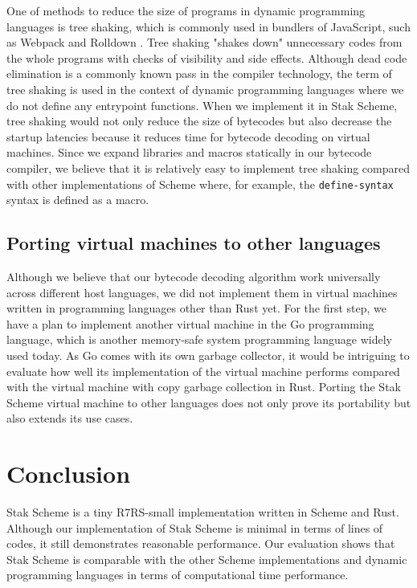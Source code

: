 \documentclass[sigplan, anonymous, review]{acmart}
\begin{document}
One of methods to reduce the size of programs in dynamic programming
languages is tree shaking\cite{treeshaking}, which is commonly used
in bundlers of JavaScript, such as Webpack \cite{webpack} and Rolldown
\cite{rolldown}.
Tree shaking "shakes down" unnecessary codes from
the whole programs with checks of visibility and side effects.
Although dead code elimination is a commonly known pass in the
compiler technology, the term of tree shaking is used
in the context of dynamic programming languages where we do not define
any entrypoint functions.
When we implement it in Stak Scheme, tree shaking would not only
reduce the size of bytecodes but also decrease the startup latencies
because it reduces time for bytecode decoding on virtual machines.
Since we expand libraries and macros statically
in our bytecode compiler, we believe that it is relatively easy to
implement tree shaking compared with other implementations of Scheme
where, for example, the \texttt{define-syntax} syntax is defined as a macro.

\subsection{Porting virtual machines to other languages} \label{portvm}

Although we believe that our bytecode decoding algorithm work
universally across different host languages, we did not implement them in
virtual machines written in programming languages other than Rust yet.
For the first step, we have a plan to implement another virtual
machine in the Go programming language, which is another memory-safe system
programming language widely used today.
As Go comes with its own garbage collector,
it would be intriguing to evaluate how well its implementation of the
virtual machine performs compared with the virtual
machine with copy garbage collection in Rust.
Porting the Stak Scheme virtual machine to other languages does
not only prove its portability but also extends its use cases.

\section{Conclusion}

Stak Scheme is a tiny R7RS-small implementation written in Scheme and
Rust.
Although our implementation of Stak Scheme is minimal in terms of
lines of codes, it still demonstrates reasonable performance.
Our evaluation shows that Stak Scheme is
comparable with the other Scheme implementations and dynamic
programming languages in terms of computational time performance.
\end{document}
